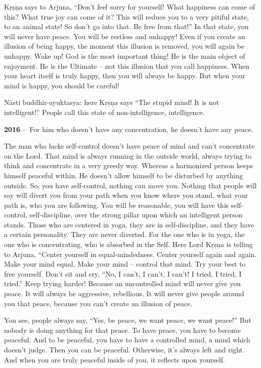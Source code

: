 Kṛṣṇa says to Arjuna, “Don’t feel sorry for yourself! What happiness can come of this? What true joy can come of it? This will reduce you to a very pitiful state, to an animal state! So don’t go into that. Be free from that!” In that state, you will never have peace. You will be restless and unhappy! Even if you create an illusion of being happy, the moment this illusion is removed, you will again be unhappy. Wake up! God is the most important thing! He is the main object of enjoyment. He is the Ultimate – not this illusion that you call happiness. When your heart itself is truly happy, then you will always be happy. But when your mind is happy, you should be careful!

Nāsti buddhir-ayuktasya: here Kṛṣṇa says “The stupid mind! It is not intelligent!” People call this state of non-intelligence, intelligence.

\textbf{2016}--- For him who doesn’t have any concentration, he doesn’t have any peace.

The man who lacks self-control doesn’t have peace of mind and can’t concentrate on the Lord. That mind is always running in the outside world, always trying to think and concentrate in a very greedy way. Whereas a harmonized person keeps himself peaceful within. He doesn’t allow himself to be disturbed by anything outside. So, you have self-control, nothing can move you. Nothing that people will say will divert you from your path when you know where you stand, what your path is, who you are following. You will be reasonable, you will have this self-control, self-discipline, over the strong pillar upon which an intelligent person stands. Those who are centered in yoga, they are in self-discipline, and they have a certain personality. They are never diverted. For the one who is in yoga, the one who is concentrating, who is absorbed in the Self. Here Lord Kṛṣṇa is telling to Arjuna, “Center yourself in equal-mindedness. Center yourself again and again. Make your mind equal. Make your mind – control that mind. Try your best to free yourself. Don’t sit and cry, “No, I can’t, I can’t, I can’t! I tried, I tried, I tried.” Keep trying harder! Because an uncontrolled mind will never give you peace. It will always be aggressive, rebellious. It will never give people around you that peace, because you can’t create an illusion of peace.

You see, people always say, “Yes, be peace, we want peace, we want peace!” But nobody is doing anything for that peace. To have peace, you have to become peaceful. And to be peaceful, you have to have a controlled mind, a mind which doesn’t judge. Then you can be peaceful. Otherwise, it’s always left and right. And when you are truly peaceful inside of you, it reflects upon yourself.

